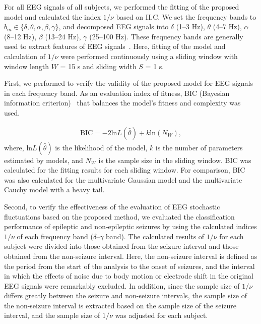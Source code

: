 \documentclass[journal]{IEEEtran}
\begin{document}
For all EEG signals of all subjects, we performed the fitting of the proposed model and calculated the index $1/\nu$ based on II.C.
We set the frequency bands to $b_m \in\{\delta, \theta, \alpha,\beta, \gamma\}$, and decomposed EEG signals into $\delta$ (1--3 Hz), $\theta$ (4--7 Hz), $\alpha$ (8--12 Hz), $\beta$ (13--24 Hz), $\gamma$ (25--100 Hz).
These frequency bands are generally used to extract features of EEG signals~\cite{ep1994}.
Here, fitting of the model and calculation of $1/\nu$ were performed continuously using a sliding window with window length $W$ = 15 s and sliding width $S$ = 1 s.

First, we performed to verify the validity of the proposed model for EEG signals in each frequency band.
As an evaluation index of fitness, BIC (Bayesian information criterion)~\cite{Schwarz1978} that balances the model's fitness and complexity was used.

\begin{align}%
	\mathrm{BIC} = -2 \mathrm{ln}L(\hat{\theta}) + k \mathrm{ln}(N_W),
\end{align}
where, $\mathrm{ln}L(\hat{\theta})$ is the likelihood of the model, $k$ is the number of parameters estimated by models, and $N_W$ is the sample size in the sliding window. BIC was calculated for the fitting results for each sliding window.
For comparison, BIC was also calculated for the multivariate Gaussian model and the multivariate Cauchy model with a heavy tail.

Second, to verify the effectiveness of the evaluation of EEG stochastic fluctuations based on the proposed method, we evaluated the classification performance of epileptic and non-epileptic seizures by using the calculated indices $1/\nu$ of each frequency band ($\delta$--$\gamma$ band). %
The calculated results of $1/\nu$ for each subject were divided into those obtained from the seizure interval and those obtained from the non-seizure interval.
Here, the non-seizure interval is defined as the period from the start of the analysis to the onset of seizures, and the interval in which the effects of noise due to body motion or electrode shift in the original EEG signals were remarkably excluded.
In addition, since the sample size of $1/\nu$ differs greatly between the seizure and non-seizure intervals, the sample size of the non-seizure interval is extracted based on the sample size of the seizure interval, and the sample size of $1/\nu$ was adjusted for each subject.
\end{document}
